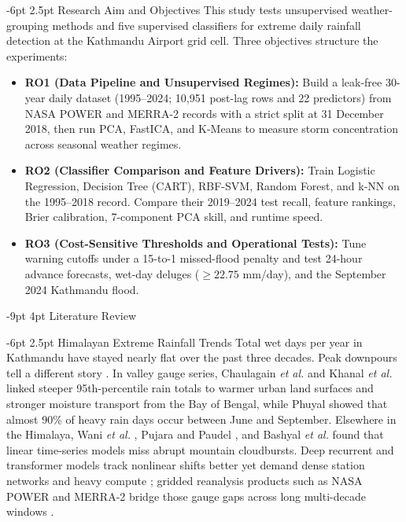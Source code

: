 \documentclass[10pt,twocolumn,a4paper]{article}
\makeatletter
\renewcommand{\section}{\@startsection{section}{1}{\z@}%
  {-9pt \@plus -2pt \@minus -1pt}%
  {4pt \@plus 1pt}%
  {\centering\normalfont\normalsize\bfseries\scshape}}
\renewcommand{\subsection}{\@startsection{subsection}{2}{\z@}%
  {-6pt \@plus -1.5pt \@minus -0.5pt}%
  {2.5pt \@plus 0.5pt}%
  {\normalfont\normalsize\bfseries\itshape}}
\makeatother
\begin{document}
\subsection{Research Aim and Objectives}
This study tests unsupervised weather-grouping methods and five supervised classifiers for extreme daily rainfall detection at the Kathmandu Airport grid cell. Three objectives structure the experiments:
\begin{itemize}
  \setlength{\itemsep}{1.5pt}\setlength{\parskip}{0pt}
  \item \textbf{RO1 (Data Pipeline and Unsupervised Regimes):} Build a leak-free 30-year daily dataset (1995--2024; 10,951 post-lag rows and 22 predictors) from NASA POWER and MERRA-2 records with a strict split at 31 December 2018, then run PCA, FastICA, and K-Means to measure storm concentration across seasonal weather regimes.
  \item \textbf{RO2 (Classifier Comparison and Feature Drivers):} Train Logistic Regression, Decision Tree (CART), RBF-SVM, Random Forest, and k-NN on the 1995--2018 record. Compare their 2019--2024 test recall, feature rankings, Brier calibration, 7-component PCA skill, and runtime speed.
  \item \textbf{RO3 (Cost-Sensitive Thresholds and Operational Tests):} Tune warning cutoffs under a 15-to-1 missed-flood penalty and test 24-hour advance forecasts, wet-day deluges ($\ge 22.75$ mm/day), and the September 2024 Kathmandu flood.
\end{itemize}

\section{Literature Review}

\subsection{Himalayan Extreme Rainfall Trends}
Total wet days per year in Kathmandu have stayed nearly flat over the past three decades. Peak downpours tell a different story \cite{ref4,ref5,ref8}. In valley gauge series, Chaulagain \textit{et al.} \cite{ref4} and Khanal \textit{et al.} \cite{ref5} linked steeper 95th-percentile rain totals to warmer urban land surfaces and stronger moisture transport from the Bay of Bengal, while Phuyal \cite{ref8} showed that almost 90\% of heavy rain days occur between June and September. Elsewhere in the Himalaya, Wani \textit{et al.} \cite{ref9}, Pujara and Paudel \cite{ref10}, and Bashyal \textit{et al.} \cite{ref11} found that linear time-series models miss abrupt mountain cloudbursts. Deep recurrent and transformer models track nonlinear shifts better yet demand dense station networks and heavy compute \cite{ref11,ref12}; gridded reanalysis products such as NASA POWER and MERRA-2 bridge those gauge gaps across long multi-decade windows \cite{ref13}.
\end{document}

